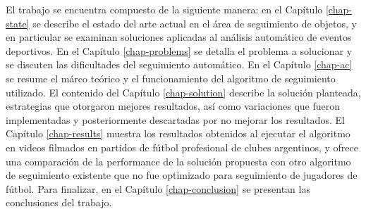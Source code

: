 \documentclass[a4paper,11pt]{report}
\begin{document}
El trabajo se encuentra compuesto de la siguiente manera: en el Capítulo
\ref{chap-state} se describe el estado del arte actual en el área de
seguimiento de objetos, y en particular se examinan soluciones aplicadas al
análisis automático de eventos deportivos. En el Capítulo
\ref{chap-problems} se detalla el problema a solucionar y se discuten las
dificultades del seguimiento automático. En el Capítulo \ref{chap-ac} se
resume el márco teórico y el funcionamiento del algoritmo de seguimiento
utilizado. El contenido del Capítulo
\ref{chap-solution} describe la solución planteada, estrategias que otorgaron
mejores resultados, así como variaciones que fueron implementadas y
posteriormente descartadas por no mejorar los resultados. El Capítulo
\ref{chap-results} muestra los resultados obtenidos al ejecutar el algoritmo en
videos filmados en partidos de fútbol profesional de clubes argentinos, y
ofrece una comparación de la performance de la solución propuesta con otro
algoritmo de seguimiento existente que no fue optimizado
para seguimiento de jugadores de fútbol. Para finalizar, en el Capítulo
\ref{chap-conclusion} se presentan las conclusiones del trabajo.

\newpage



\newpage



\newpage



\newpage



\newpage



\newpage



\printbibliography


\end{document}
